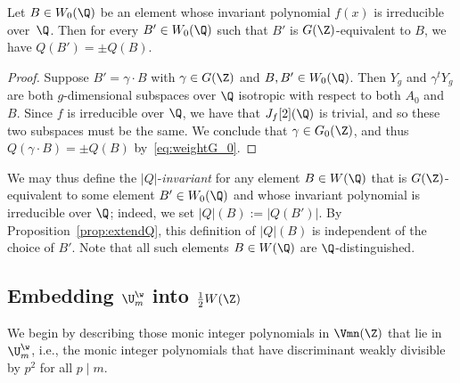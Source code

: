 \begin{proposition}
\notready\label{prop:extendQ}
Let $B\in W_0(\Q)$ be an element whose invariant polynomial $f(x)$ is
irreducible over~$\Q$. Then for every $B'\in W_0(\Q)$ such that $B'$ is $G(\Z)$-equivalent to $B$, we have
$Q(B')=\pm Q(B)$.
\end{proposition}
\begin{proof}
Suppose $B'=\gamma\cdot B$ with $\gamma\in G(\Z)$ and $B,B'\in
W_0(\Q)$.  Then $Y_g$ and $\gamma^t Y_g$ are both $g$-dimensional
subspaces over $\Q$ isotropic with respect to both $A_0$ and
$B$. Since $f$ is irreducible over $\Q$, we have that $J_f[2](\Q)$ is
trivial, and so these two subspaces must be the same.  We conclude
that $\gamma\in G_0(\Z)$, and thus $Q(\gamma\cdot B)=\pm Q(B)$
by~\eqref{eq:weightG_0}.
\end{proof}

We may thus define the $|Q|$-{\it invariant} for any element $B\in
W(\Q)$ that is $G(\Z)$-equivalent to some element $B'\in W_0(\Q)$ and
whose invariant polynomial is irreducible over $\Q$; indeed, we set
$|Q|(B):=|Q(B')|$. By Proposition~\ref{prop:extendQ}, this definition
of $|Q|(B)$ is independent of the choice of $B'$. Note that all such
elements $B\in W(\Q)$ are $\Q$-distinguished.

\subsection{Embedding $\U_m^\w$ into $\frac12W(\Z)$}\label{sembedodd}

We begin by describing those monic integer polynomials in $\Vmn(\Z)$
that lie in $\U_m^\w$, i.e., the monic integer polynomials that have
discriminant weakly divisible by $p^2$ for all $p\mid m$.

